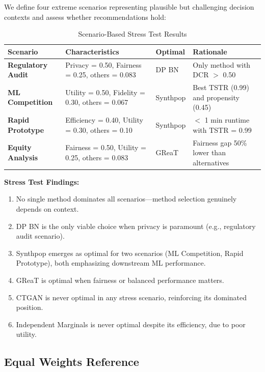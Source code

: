 \documentclass[12pt,a4paper]{article}
\begin{document}
We define four extreme scenarios representing plausible but challenging decision contexts and assess whether recommendations hold:

\begin{table}[htbp]
\centering
\caption{Scenario-Based Stress Test Results}
\label{tab:stress_test}
\begin{tabular}{@{}p{3cm}p{4cm}lp{4cm}@{}}
\toprule
\textbf{Scenario} & \textbf{Characteristics} & \textbf{Optimal} & \textbf{Rationale} \\
\midrule
\textbf{Regulatory Audit} & Privacy = 0.50, Fairness = 0.25, others = 0.083 & DP BN & Only method with DCR $>$ 0.50 \\
\textbf{ML Competition} & Utility = 0.50, Fidelity = 0.30, others = 0.067 & Synthpop & Best TSTR (0.99) and propensity (0.45) \\
\textbf{Rapid Prototype} & Efficiency = 0.40, Utility = 0.30, others = 0.10 & Synthpop & $<$ 1 min runtime with TSTR = 0.99 \\
\textbf{Equity Analysis} & Fairness = 0.50, Utility = 0.25, others = 0.083 & GReaT & Fairness gap 50\% lower than alternatives \\
\bottomrule
\end{tabular}
\end{table}

\textbf{Stress Test Findings:}
\begin{enumerate}
    \item No single method dominates all scenarios---method selection genuinely depends on context.
    \item DP BN is the only viable choice when privacy is paramount (e.g., regulatory audit scenario).
    \item Synthpop emerges as optimal for two scenarios (ML Competition, Rapid Prototype), both emphasizing downstream ML performance.
    \item GReaT is optimal when fairness or balanced performance matters.
    \item CTGAN is never optimal in any stress scenario, reinforcing its dominated position.
    \item Independent Marginals is never optimal despite its efficiency, due to poor utility.
\end{enumerate}

\subsection{Equal Weights Reference}
\end{document}
